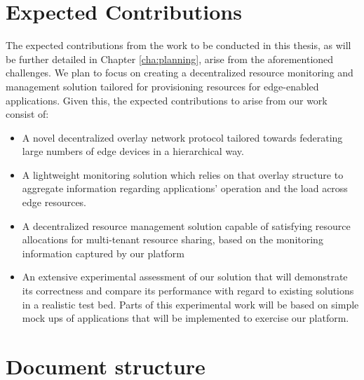 \section{Expected Contributions}

The expected contributions from the work to be conducted in this thesis, as will be further detailed in Chapter \ref{cha:planning}, arise from the aforementioned challenges. We plan to focus on creating a decentralized resource monitoring and management solution tailored for provisioning resources for edge-enabled applications. Given this, the expected contributions to arise from our work consist of: 

\begin{itemize}

    \item A novel decentralized overlay network protocol tailored towards federating large numbers of edge devices in a hierarchical way.
    
    \item A lightweight monitoring solution which relies on that overlay structure to aggregate information regarding applications’ operation and the load across edge resources.
    
    \item A decentralized resource management solution capable of satisfying resource allocations for multi-tenant resource sharing, based on the monitoring information captured by our platform
    
    \item An extensive experimental assessment of our solution that will demonstrate its correctness and compare its performance with regard to existing solutions in a realistic test bed. Parts of this experimental work will be based on simple mock ups of applications that will be implemented to exercise our platform.



    
\end{itemize}

\section{Document structure}

